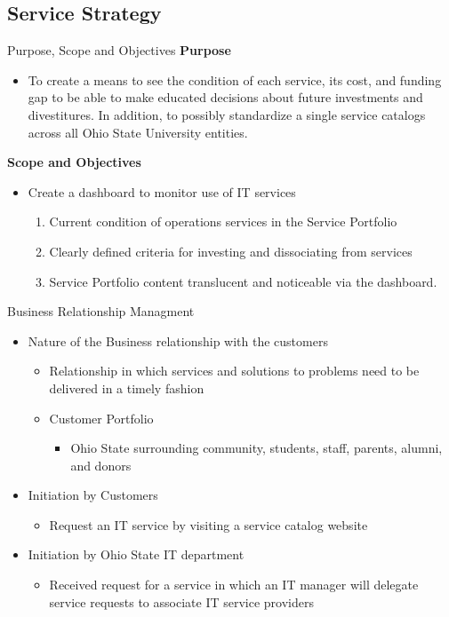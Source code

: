 \documentclass[xcolor=x11names,compress]{beamer}
\renewcommand{\(}{\begin{columns}}
\renewcommand{\)}{\end{columns}}
\newcommand{\<}[1]{\begin{column}{#1}}
\renewcommand{\>}{\end{column}}
\begin{document}
\subsection{Service Strategy}
\begin{frame}{Purpose, Scope and Objectives}
\textbf{Purpose}
\begin{itemize}
	\item To create a means to see the condition of each service, its cost, and funding gap to be able to make educated decisions about future investments and divestitures. In addition, to possibly standardize a single service catalogs across all Ohio State University entities.
\end{itemize}
\textbf{Scope and Objectives}
\begin{itemize}
	\item Create a dashboard to monitor use of IT services
\begin{enumerate}
	\item Current condition of operations services in the Service Portfolio
	\item Clearly defined criteria for investing and dissociating from services
	\item Service Portfolio content translucent and noticeable via the dashboard.
\end{enumerate}
\end{itemize}
\end{frame}
\begin{frame}{Business Relationship Managment}
\begin{itemize}
	\item Nature of the Business relationship with the customers
	\begin{itemize}
		\item Relationship in which services and solutions to problems need to be delivered in a timely fashion
		\item Customer Portfolio
		\begin{itemize}
			\item Ohio State surrounding community, students, staff, parents, alumni, and donors
		\end{itemize}
	\end{itemize}
	\item Initiation by Customers
	\begin{itemize}
		\item Request an IT service by visiting a service catalog website
	\end{itemize}
	\item Initiation by Ohio State IT department
	\begin{itemize}
		\item Received request for a service in which an IT manager will delegate service requests to associate IT service providers
	\end{itemize}
\end{itemize}
\end{frame}
\end{document}
